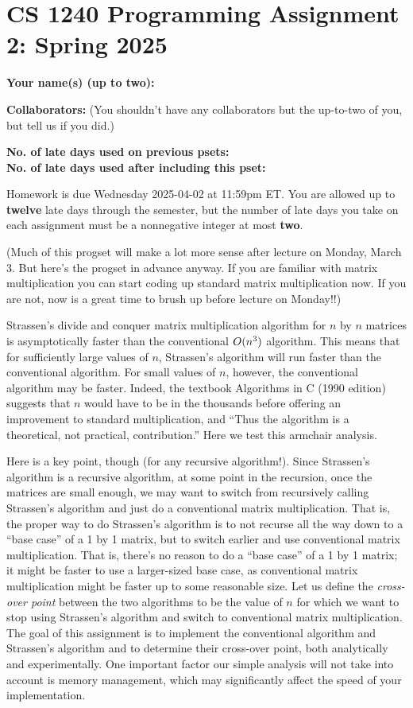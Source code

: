 \documentclass[11pt]{article}
\def\O{\mathop{\smash{O}}\nolimits}
\begin{document}
	
	\section*{CS 1240 Programming Assignment 2: Spring 2025}
 		
	\textbf{Your name(s) (up to two):} 
		
	\textbf{Collaborators:} (You shouldn't have any collaborators but the up-to-two of you, but tell us if you did.)

	\textbf{No. of late days used on previous psets: }\\ \indent
	\textbf{No. of late days used after including this pset: }

Homework is due Wednesday 2025-04-02 at 11:59pm ET. You are allowed up to {\bf twelve} late days through the semester, but the number of late days you take on each assignment must be a nonnegative integer at most {\bf two}. 


(Much of this progset will make a lot more sense after lecture on Monday, March 3. But here's the progset in advance anyway. If you are familiar with matrix multiplication you can start coding up standard matrix multiplication now. If you are not, now is a great time to brush up before lecture on Monday!!)

Strassen's divide and conquer matrix multiplication algorithm for $n$
by $n$ matrices is asymptotically faster than the conventional
$\O(n^3)$ algorithm.  This means that for sufficiently large values of
$n$, Strassen's algorithm will run faster than the conventional
algorithm.  For small values of $n$, however, the conventional
algorithm may be faster.  Indeed, the textbook Algorithms in C (1990
edition) suggests that $n$ would have to be in the thousands before
offering an improvement to standard multiplication, and ``Thus the
algorithm is a theoretical, not practical, contribution.''  Here we
test this armchair analysis.

Here is a key point, though (for any recursive algorithm!).  Since
Strassen's algorithm is a recursive algorithm, at some point in the
recursion, once the matrices are small enough, we may want to switch
from recursively calling Strassen's algorithm and just do a
conventional matrix multiplication.  That is, the proper way to do
Strassen's algorithm is to not recurse all the way down to a ``base
case'' of a 1 by 1 matrix, but to switch earlier and use conventional
matrix multiplication.  That is, there's no reason to do a ``base
case'' of a 1 by 1 matrix; it might be faster to use a larger-sized
base case, as conventional matrix multiplication might be faster up to
some reasonable size.  Let us define the {\em cross-over point}
between the two algorithms to be the value of $n$ for which we want to
stop using Strassen's algorithm and switch to conventional matrix
multiplication.  The goal of this assignment is to implement the
conventional algorithm and Strassen's algorithm and to determine their
cross-over point, both analytically and experimentally.  One important
factor our simple analysis will not take into account is memory
management, which may significantly affect the speed of your
implementation.
\end{document}
